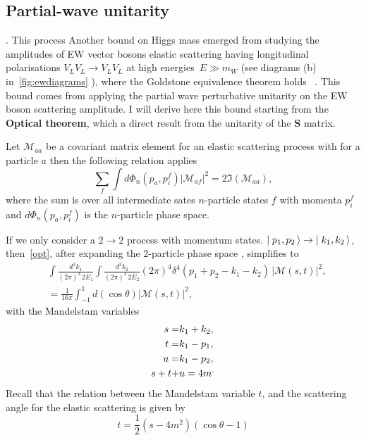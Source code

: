 \subsection{Partial-wave unitarity}. This process
Another bound on Higgs mass emerged from studying the amplitudes of EW vector bosons elastic scattering having longitudinal polarisations $V_L V_L \to V_L V_L$ at high energies~$ E \gg m_W$ (see diagrams (b) in~\autoref{fig:ewdiagrams} ), where the Goldstone equivalence theorem holds ~\cite{PhysRevD.42.853}. 
This bound comes from applying the partial wave perturbative unitarity on the EW boson scattering amplitude. I will derive here this bound starting from the \textbf{Optical theorem}, which a direct result from the unitarity of the $\mathbf S$ matrix.
\begin{tcolorbox}[title=The optical theorem,
	title filled=false,
	colback=Mahogany!5!white,
	colframe=Mahogany]
	Let $\mathcal M_{aa}$ be a covariant matrix element for an elastic  scattering process with for a particle $a$  then the following relation applies
	\begin{equation}
		\sum_{f}  \int d\Phi_n(p_a,p_i^f)| \mathcal M_{af}|^2 = 2 \mathfrak{I}( \mathcal M_{aa}),
		\label{opt}
	\end{equation}
	where the sum is over all intermediate sates $n$-particle states $f$ with momenta $p_i^f$ and $d\Phi_n(p_a,p_i^f)$ is the $n$-particle phase space.
\end{tcolorbox}
If we only consider a $2 \to 2$ process with momentum states. $\mbox{$\mid p_1,p_2\,\rangle$} \to \mbox{$\mid k_1,k_2\,\rangle$}$, then~\eqref{opt}, after expanding the $2$-particle phase space ,
simplifies to 
\begin{align}
	&\int  \frac{d^3k_1}{(2 \pi)^3\,2E_1} \int  \frac{d^3k_2}{(2 \pi)^3\,2E_2} (2 \pi)^4 \delta^4(p_1+p_2-k_1-k_2)\,| \mathcal M (s,t)|^2 ,\nonumber \\
	&= \frac{1}{16 \pi} \int_{-1}^{1} d(\cos \theta) | \mathcal M (s,t)|^2,
\end{align}
with the Mandelstam variables 
\begin{align}
	s = &k_1+k_2, \nonumber \\
	t =& k_1-p_1, \nonumber \\
	u=& k_1-p_2, \\
	s+t+&u = 4 m^. \nonumber
\end{align}
Recall that the relation between the Mandelstam variable $t$, and the scattering angle for the elastic scattering is given by
\begin{equation}
	t = \frac{1}{2} (s-4 m^2)(\cos \theta-1)
\end{equation}
